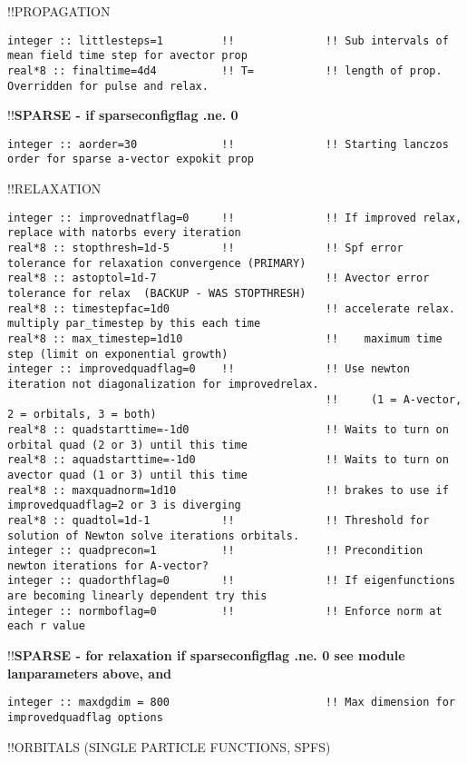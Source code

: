 !!{\large \quad PROPAGATION}
\begin{verbatim}
integer :: littlesteps=1         !!              !! Sub intervals of mean field time step for avector prop
real*8 :: finaltime=4d4          !! T=           !! length of prop.  Overridden for pulse and relax.  
\end{verbatim}
!!\textbf{\qquad SPARSE - if sparseconfigflag .ne. 0}
\begin{verbatim}
integer :: aorder=30             !!              !! Starting lanczos order for sparse a-vector expokit prop
\end{verbatim}
!!{\large \quad RELAXATION}
\begin{verbatim}
integer :: improvednatflag=0     !!              !! If improved relax, replace with natorbs every iteration
real*8 :: stopthresh=1d-5        !!              !! Spf error tolerance for relaxation convergence (PRIMARY)
real*8 :: astoptol=1d-7                          !! Avector error tolerance for relax  (BACKUP - WAS STOPTHRESH)
real*8 :: timestepfac=1d0                        !! accelerate relax. multiply par_timestep by this each time
real*8 :: max_timestep=1d10                      !!    maximum time step (limit on exponential growth)
integer :: improvedquadflag=0    !!              !! Use newton iteration not diagonalization for improvedrelax.
                                                 !!     (1 = A-vector, 2 = orbitals, 3 = both)
real*8 :: quadstarttime=-1d0                     !! Waits to turn on orbital quad (2 or 3) until this time
real*8 :: aquadstarttime=-1d0                    !! Waits to turn on avector quad (1 or 3) until this time
real*8 :: maxquadnorm=1d10                       !! brakes to use if improvedquadflag=2 or 3 is diverging
real*8 :: quadtol=1d-1           !!              !! Threshold for solution of Newton solve iterations orbitals.
integer :: quadprecon=1          !!              !! Precondition newton iterations for A-vector?
integer :: quadorthflag=0        !!              !! If eigenfunctions are becoming linearly dependent try this
integer :: normboflag=0          !!              !! Enforce norm at each r value
\end{verbatim}
!!\textbf{\qquad SPARSE - for relaxation if sparseconfigflag .ne. 0 see module lanparameters above, and}
\begin{verbatim}
integer :: maxdgdim = 800                        !! Max dimension for improvedquadflag options
\end{verbatim}
!!{\large \quad ORBITALS (SINGLE PARTICLE FUNCTIONS, SPFS)}
